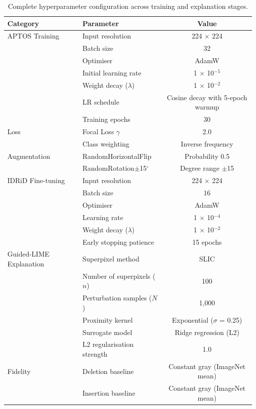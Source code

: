 \documentclass[10pt,twoside]{article}
\begin{document}
\begin{table}[ht]
\caption{Complete hyperparameter configuration across training and explanation stages.}
\centering
\label{tab:hyperparams}
\begin{tabular}{llc}
\toprule
Category & Parameter & Value \\
\midrule
APTOS Training & Input resolution & 224 $\times$ 224 \\
& Batch size & 32 \\
& Optimiser & AdamW \\
& Initial learning rate & 1 $\times$ 10$^{-5}$ \\
& Weight decay ($\lambda$) & 1 $\times$ 10$^{-2}$ \\
& LR schedule & Cosine decay with 5-epoch warmup \\
& Training epochs & 30 \\
\midrule
Loss & Focal Loss $\gamma$ & 2.0 \\
& Class weighting & Inverse frequency \\
\midrule
Augmentation & RandomHorizontalFlip & Probability 0.5 \\
& RandomRotation$\pm$15$^\circ$ & Degree range $\pm$15 \\
\midrule
IDRiD Fine-tuning & Input resolution & 224 $\times$ 224 \\
& Batch size & 16 \\
& Optimiser & AdamW \\
& Learning rate & 1 $\times$ 10$^{-4}$ \\
& Weight decay ($\lambda$) & 1 $\times$ 10$^{-2}$ \\
& Early stopping patience & 15 epochs \\
\midrule
Guided-LIME Explanation & Superpixel method & SLIC \\
& Number of superpixels ($n$) & 100 \\
& Perturbation samples ($N$) & 1,000 \\
& Proximity kernel & Exponential ($\sigma$ = 0.25) \\
& Surrogate model & Ridge regression (L2) \\
& L2 regularisation strength & 1.0 \\
\midrule
Fidelity & Deletion baseline & Constant gray (ImageNet mean) \\
& Insertion baseline & Constant gray (ImageNet mean) \\
\bottomrule
\end{tabular}
\end{table}
\end{document}
